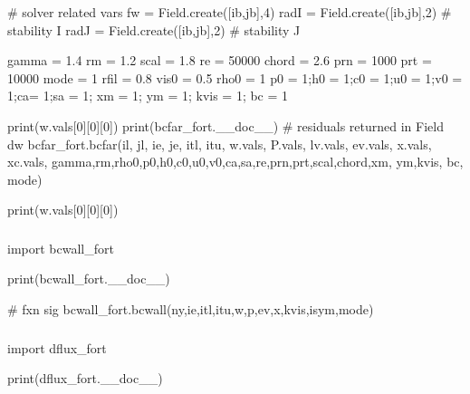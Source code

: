 \documentclass[letterpaper,10pt,english]{sphinxmanual}
\begin{document}
\sphinxAtStartPar
\# solver related vars
fw = Field.create({[}ib,jb{]},4)
radI = Field.create({[}ib,jb{]},2) \# stability I
radJ = Field.create({[}ib,jb{]},2) \# stability J

\sphinxAtStartPar
gamma = 1.4
rm = 1.2
scal = 1.8
re = 50000
chord = 2.6
prn = 1000
prt = 10000
mode = 1
rfil = 0.8
vis0 = 0.5
rho0 = 1
p0 = 1;h0 = 1;c0 = 1;u0 = 1;v0 = 1;ca= 1;sa = 1; xm = 1; ym = 1; kvis = 1; bc = 1

\sphinxAtStartPar
print(w.vals{[}0{]}{[}0{]}{[}0{]})
print(bcfar\_fort.\_\_doc\_\_)
\# residuals returned in Field dw
bcfar\_fort.bcfar(il, jl, ie, je, itl, itu,       w.vals, P.vals, lv.vals, ev.vals,        x.vals, xc.vals,       gamma,rm,rho0,p0,h0,c0,u0,v0,ca,sa,re,prn,prt,scal,chord,xm,       ym,kvis,       bc,       mode)

\sphinxAtStartPar
print(w.vals{[}0{]}{[}0{]}{[}0{]})


\subsubsection{}
\label{\detokenize{autoapi/tests/test_bcwall/index:module-tests.test_bcwall}}\label{\detokenize{autoapi/tests/test_bcwall/index:tests-test-bcwall}}\label{\detokenize{autoapi/tests/test_bcwall/index::doc}}
\sphinxAtStartPar
import bcwall\_fort

\sphinxAtStartPar
print(bcwall\_fort.\_\_doc\_\_)

\sphinxAtStartPar
\# fxn sig
bcwall\_fort.bcwall(ny,ie,itl,itu,w,p,ev,x,kvis,isym,mode)


\subsubsection{}
\label{\detokenize{autoapi/tests/test_dflux/index:module-tests.test_dflux}}\label{\detokenize{autoapi/tests/test_dflux/index:tests-test-dflux}}\label{\detokenize{autoapi/tests/test_dflux/index::doc}}
\sphinxAtStartPar
import dflux\_fort

\sphinxAtStartPar
print(dflux\_fort.\_\_doc\_\_)
\end{document}
